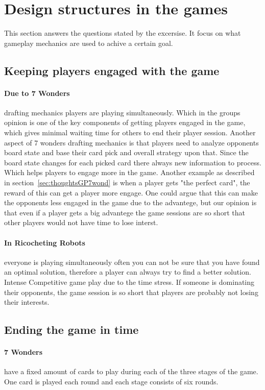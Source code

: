 \documentclass[a4paper]{article}
\begin{document}
\section{Design structures in the games}
This section answers the questions stated by the excersise. It focus on what gameplay mechanics are used to achive a certain goal. 

\subsection{Keeping players engaged with the game}
\paragraph{Due to 7 Wonders} drafting mechanics players are playing simultaneously. Which in the groups opinion is one of the key components of getting players engaged in the game, which gives minimal waiting time for others to end their player session. Another aspect of 7 wonders drafting mechanics is that players need to analyze opponents board state and base their card pick and overall strategy upon that. Since the board state changes for each picked card there always new information to process. Which helps players to engage more in the game.
Another example as described in section~\ref{sec:thoughtsGP7wond} is when a player gets "the perfect card", the reward of this can get a player more engage. One could argue that this can make the opponents less engaged in the game due to the advantege, but our opinion is that even if a player gets a big advantege the game sessions are so short that other players would not have time to lose interst.  

\paragraph{In Ricocheting Robots} everyone is playing simultaneously often you can not be sure that you have found an optimal solution, therefore a player can always try to find a better solution. Intense Competitive game play due to the time stress. If someone is dominating their opponents, the game session is so short that players are probably not losing their interests.

\subsection{Ending the game in time}
\paragraph{7 Wonders} have a fixed amount of cards to play during each of the three stages of the game. One card is played each round and each stage consists of six rounds.
\end{document}
